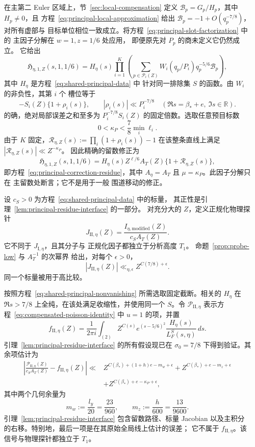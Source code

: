 \documentclass[11pt,a4paper]{article}
\numberwithin{equation}{section}
\numberwithin{figure}{section}
\theoremstyle{definition}
\theoremstyle{remark}
\begin{document}
在主第二 Euler 区域上，节~\ref{sec:local-compensation}
定义 \(\mathcal B_p=G_p/H_p\)，其中 \(H_p\ne0\)，且
方程~\eqref{eq:principal-local-approximation} 给出
\(\mathcal B_p=-1+O(q_p^{-7/8})\)，对所有虚部与
目标单位相位一致成立。将方程~\eqref{eq:principal-slot-factorization} 中的
主因子分解在 \(w=1,z=1/6\) 处应用，
即便原先对 \(P_p\) 的商未定义它仍然成立。
它给出
\[
 \mathfrak H_{\eta,1,Z}(s,1,1/6)
 =H_\eta(s)\prod_{i=1}^K
       \left(\sum_{p\in\mathcal P_i(Z)}
           W_i(q_p/P_i)q_p^{-5/6}\mathcal B_p\right),
\]
其中 \(H_\eta\) 是方程~\eqref{eq:shared-principal-data} 中
针对同一排除集 \(S\) 的函数。由 \(W_i\) 的非负性，其第 \(i\) 个
槽位等于
\[
 -S_i(Z)\{1+\rho_i(s)\},\qquad
 |\rho_i(s)|\ll P_i^{-7/8}
 \quad(\Re s=\beta_*+e,\ \Im s\in\mathbb R).
\]
的确，绝对局部误差之和至多为
\(P_i^{-7/8}S_i(Z)\) 的固定倍数。选取任意预目标数
\[
 0<\kappa_P<\frac78\min_i\ell_i.
\]
由于 \(K\) 固定，\(\mathcal R_{\eta,Z}(s):=\prod_i(1+\rho_i(s))-1\)
在该整条直线上满足 \(|\mathcal R_{\eta,Z}(s)|\ll Z^{-\kappa_P}\)。
因此精确的留数修正为
\[
 \mathfrak H_{\eta,1,Z}(s,1,1/6)
 =H_\eta(s)Z^{\ell/6}A_T(Z)\{1+\mathcal R_{\eta,Z}(s)\},
\]
即方程~\eqref{eq:principal-correction-residue}，其中
\(A_\eta=A_T\) 且 \(\mu=\kappa_P\)。此因子分解只在
主留数处断言；它不是用于一般
围道移动的修正。

设 \(c_S>0\) 为方程~\eqref{eq:shared-principal-data} 中的标量，
其正性是引理~\ref{lem:principal-residue-interface} 的一部分。
对充分大的 \(Z\)，定义正规化物理探针
\[
 J_{\mathrm{II},\eta}(Z)
   =\frac{I_{\eta,\mathrm{modified}}(Z)}{c_S A_T(Z)}.
\]
它不同于 \(J_{\mathrm I,\eta}\)，且其分子与
正规化因子都独立于分析高度 \(T_1\)。
命题~\ref{prop:probe-low} 与 \(A_T^{-1}\) 的次幂界
给出，对每个 \(\epsilon>0\)，
\begin{equation}\label{eq:part-II-normalized-low}
 |J_{\mathrm{II},\eta}(Z)|
 \ll_{\eta,\epsilon} Z^{C(7/8)+\epsilon}.
\end{equation}
同一个标量被用于高比较。

按照方程~\eqref{eq:shared-principal-nonvanishing} 所需选取固定截断。相关的
\(H_\eta\) 在 \(\Re s>7/8\) 上全纯，在该处满足收缩性，并使用同一个
\(S\)。令 \(\mathscr P_{\mathrm{II},\eta}\) 表示方程~\eqref{eq:compensated-poisson-identity}
中 \(u=1\) 的项，并置
\[
 f_{\mathrm{II},\eta}(Z)=\frac1{2\pi i}\int_{(2)}
 Z^{C(s)}e^{(s-5/6)^2}\frac{H_\eta(s)}{L_F^S(s,\eta)}\,ds.
\]
引理~\ref{lem:principal-residue-interface} 的所有假设现已在 \(\sigma_0=7/8\)
下得到验证。其余项估计为
\[
 \begin{split}
 \left|\frac{\mathscr P_{\mathrm{II},\eta}(Z)}{c_S A_T(Z)}
       -f_{\mathrm{II},\eta}(Z)\right|
 \ll{}&
 Z^{C(\beta_*)+(1+h)e-m_w+\epsilon}
 +Z^{C(\beta_*)+e-m_z+\epsilon}\\
 &+Z^{C(\beta_*)+e-\kappa_P+\epsilon},
 \end{split}
\]
其中两个几何余量为
\begin{equation}\label{old-eq:5.14}
 m_w:=\frac{l_y}{20}=\frac{23}{960},\qquad
 m_z:=\frac h{600}=\frac{13}{9600}.
\end{equation}
引理~\ref{lem:principal-residue-interface} 包含留数路径、标量 Jacobian
以及主积分的右移。特别地，最后一项是在其原始全局线上估计的误差；
它不属于 \(f_{\mathrm{II},\eta}\)。该信号与物理探针都独立于 \(T_1\)。
\end{document}
